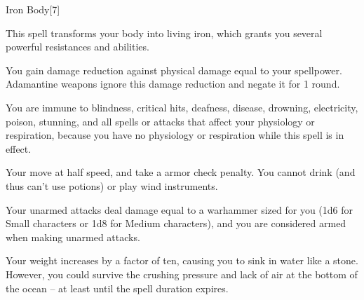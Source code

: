 \begin{spellfooter}
\begin{spellsection}{Iron Body}[7]
    \begin{spellheader}
    \end{spellheader}
    \begin{spellcontent}
        \begin{spelltargetinginfo}
        \end{spelltargetinginfo}
        \begin{spelleffects}
            \spelleffect This spell transforms your body into living iron, which grants you several powerful resistances and abilities.
            \par You gain damage reduction against physical damage equal to your spellpower. Adamantine weapons ignore this damage reduction and negate it for 1 round.
            \par You are immune to blindness, critical hits, deafness, disease, drowning, electricity, poison, stunning, and all spells or attacks that affect your physiology or respiration, because you have no physiology or respiration while this spell is in effect.
            \par Your move at half speed, and take a  armor check penalty. You cannot drink (and thus can't use potions) or play wind instruments.
            \par Your unarmed attacks deal damage equal to a warhammer sized for you (1d6 for Small characters or 1d8 for Medium characters), and you are considered armed when making unarmed attacks.
            \par Your weight increases by a factor of ten, causing you to sink in water like a stone. However, you could survive the crushing pressure and lack of air at the bottom of the ocean -- at least until the spell duration expires.
            \spelldur \durshort \dismissable
        \end{spelleffects}
    \end{spellcontent}
    \begin{spellfooter}
        \miscastexplode
    \end{spellfooter}
\end{spellsection}


\end{spellfooter}
